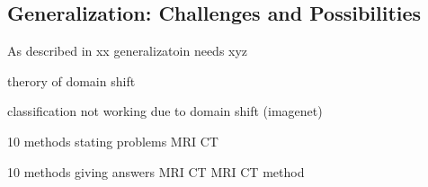 


    \subsection{Generalization: Challenges and Possibilities} %


        As described in xx generalizatoin needs xyz

        \citep{ben2010theory} therory of domain shift


        \citep{recht2019imagenet} classification not working due to domain shift (imagenet)

        \citep{wang2022generalizing}

        \citep{yang2024generalized}



        10 methods stating problems MRI CT

        10 methods giving answers MRI CT
        \citep{ouyang2022causality} MRI CT method


